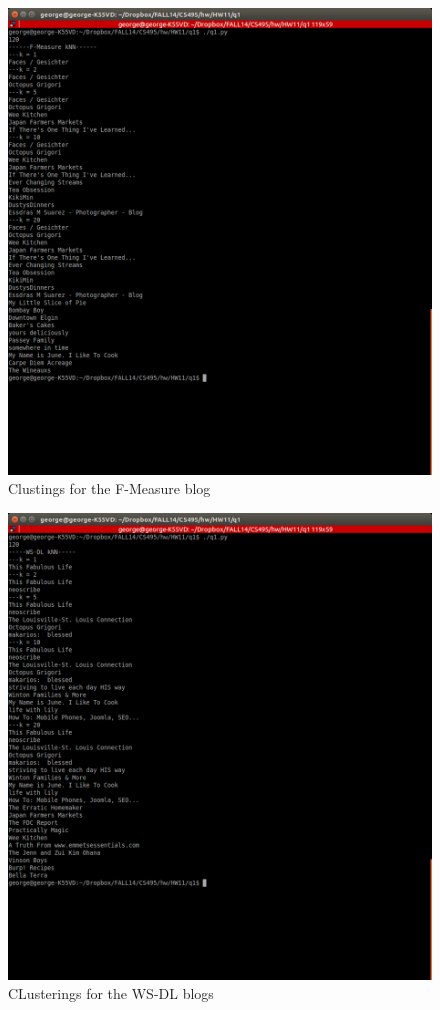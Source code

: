 \begin{figure}
\includegraphics[width=\textwidth]{fm}
\caption{Clustings for the F-Measure blog}
\end{figure}


\begin{figure}
\includegraphics[width=\textwidth]{ws}
\caption{CLusterings for the WS-DL blogs}
\end{figure}





